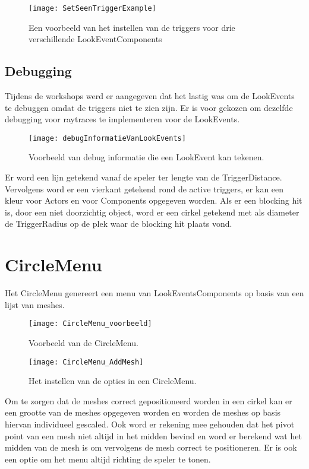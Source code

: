 \begin{figure}[!ht]
  \centering
    \texttt{[image: SetSeenTriggerExample]}
    \caption{Een voorbeeld van het instellen van de triggers voor drie verschillende LookEventComponents}
\end{figure}

\subsection{Debugging}
Tijdens de workshops werd er aangegeven dat het lastig was om de LookEvents te debuggen omdat de triggers niet te zien zijn. Er is voor gekozen om dezelfde debugging voor raytraces te implementeren voor de LookEvents.

\begin{figure}[!ht]
  \centering
    \texttt{[image: debugInformatieVanLookEvents]}
    \caption{Voorbeeld van debug informatie die een LookEvent kan tekenen.}
\end{figure}

Er word een lijn getekend vanaf de speler ter lengte van de TriggerDistance. Vervolgens word er een vierkant getekend rond de active triggers, er kan een kleur voor Actors en voor Components opgegeven worden. Als er een blocking hit is, door een niet doorzichtig object, word er een cirkel getekend met als diameter de TriggerRadius op de plek waar de blocking hit plaats vond.

\section{CircleMenu}
Het CircleMenu genereert een menu van LookEventsComponents op basis van een lijst van meshes.

\begin{figure}[!ht]
  \centering
    \texttt{[image: CircleMenu\_voorbeeld]}
    \caption{Voorbeeld van de CircleMenu.}
\end{figure}

\begin{figure}[!ht]
  \centering
    \texttt{[image: CircleMenu\_AddMesh]}
    \caption{Het instellen van de opties in een CircleMenu.}
\end{figure}

Om te zorgen dat de meshes correct gepositioneerd worden in een cirkel kan er een grootte van de meshes opgegeven worden en worden de meshes op basis hiervan individueel gescaled. Ook word er rekening mee gehouden dat het pivot point van een mesh niet altijd in het midden bevind en word er berekend wat het midden van de mesh is om vervolgens de mesh correct te positioneren. Er is ook een optie om het menu altijd richting de speler te tonen. 

